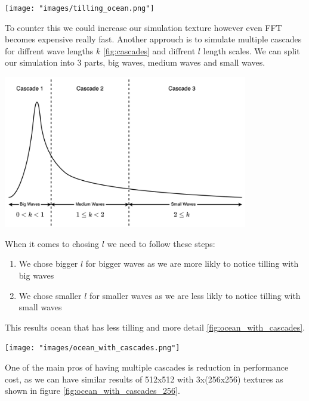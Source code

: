 \begin{minipage}{1\textwidth}
    \centering
    \texttt{[image: "images/tilling\_ocean.png"]}
    \label{fig:ocean_with_tilling}
\end{minipage}

To counter this we could increase our simulation texture however even FFT becomes expensive really fast.
Another approuch is to simulate multiple cascades for diffrent wave lengths $k$ \ref{fig:cascades} and diffrent $l$ length scales. We can split our simulation into 3 parts, big waves, medium waves and small waves.

\begin{minipage}{1\textwidth}
    \centering
    \includegraphics[width=0.8\textwidth]{"images/cascades.png"}
    \label{fig:cascades}
\end{minipage}
When it comes to chosing $l$ we need to follow these steps:
\begin{enumerate}
    \item We chose bigger $l$ for bigger waves as we are more likly to notice tilling with big waves
    \item We chose smaller $l$ for smaller waves as we are less likly to notice tilling with small waves
\end{enumerate}
This results ocean that has less tilling and more detail \ref{fig:ocean_with_cascades}.

\begin{minipage}{1\textwidth}
    \centering
    \texttt{[image: "images/ocean\_with\_cascades.png"]}
    \label{fig:ocean_with_cascades}
\end{minipage}

One of the main pros of having multiple cascades is reduction in performance cost, as we can have similar results of 512x512 with 3x(256x256) textures as shown in figure \ref{fig:ocean_with_cascades_256}.


